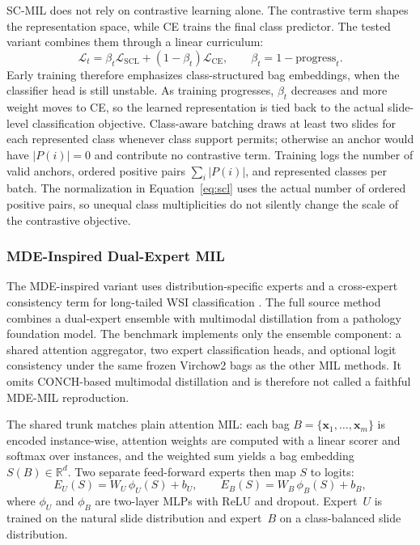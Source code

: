 \documentclass[11pt]{article}
\begin{document}
SC-MIL does not rely on contrastive learning alone. The contrastive term shapes the representation space, while CE trains the final class predictor. The tested variant combines them through a linear curriculum:
\begin{equation}
  \mathcal{L}_t =
  \beta_t\mathcal{L}_{\mathrm{SCL}} +
  (1-\beta_t)\mathcal{L}_{\mathrm{CE}},
  \qquad
  \beta_t = 1-\mathrm{progress}_t.
  \label{eq:scmil}
\end{equation}
\noindent Early training therefore emphasizes class-structured bag embeddings, when the classifier head is still unstable. As training progresses, $\beta_t$ decreases and more weight moves to CE, so the learned representation is tied back to the actual slide-level classification objective. Class-aware batching draws at least two slides for each represented class whenever class support permits; otherwise an anchor would have $|P(i)|=0$ and contribute no contrastive term. Training logs the number of valid anchors, ordered positive pairs $\sum_i|P(i)|$, and represented classes per batch. The normalization in Equation~\eqref{eq:scl} uses the actual number of ordered positive pairs, so unequal class multiplicities do not silently change the scale of the contrastive objective.

\subsubsection{MDE-Inspired Dual-Expert MIL}
The MDE-inspired variant uses distribution-specific experts and a cross-expert consistency term for long-tailed WSI classification \citep{ling2025mdeMil}. The full source method combines a dual-expert ensemble with multimodal distillation from a pathology foundation model. The benchmark implements only the ensemble component: a shared attention aggregator, two expert classification heads, and optional logit consistency under the same frozen Virchow2 bags as the other MIL methods. It omits CONCH-based multimodal distillation and is therefore not called a faithful MDE-MIL reproduction.

The shared trunk matches plain attention MIL: each bag $B=\{\mathbf{x}_1,\ldots,\mathbf{x}_m\}$ is encoded instance-wise, attention weights are computed with a linear scorer and softmax over instances, and the weighted sum yields a bag embedding $S(B)\in\mathbb{R}^{d}$. Two separate feed-forward experts then map $S$ to logits:
\begin{equation}
  E_U(S) = W_U\,\phi_U(S) + b_U,
  \qquad
  E_B(S) = W_B\,\phi_B(S) + b_B,
  \label{eq:mde-experts}
\end{equation}
\noindent where $\phi_U$ and $\phi_B$ are two-layer MLPs with ReLU and dropout. Expert~$U$ is trained on the natural slide distribution and expert~$B$ on a class-balanced slide distribution.
\end{document}
